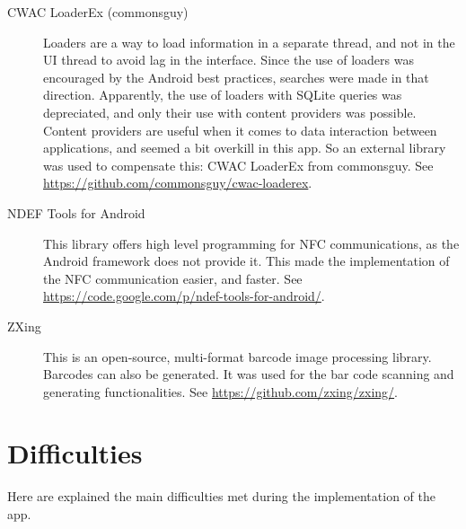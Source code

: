 \begin{description}
\item[CWAC LoaderEx (commonsguy)] Loaders are a way to load information in a separate thread, and not in the UI thread to avoid lag in the interface. Since the use of loaders was encouraged by the Android best practices, searches were made in that direction. Apparently, the use of loaders with SQLite queries was depreciated, and only their use with content providers was possible. Content providers are useful when it comes to data interaction between applications, and seemed a bit overkill in this app. So an external library was used to compensate this: CWAC LoaderEx from commonsguy. See \url{https://github.com/commonsguy/cwac-loaderex}.

\item[NDEF Tools for Android] This library offers high level programming for NFC communications, as the Android framework does not provide it. This made the implementation of the NFC communication easier, and faster. See \url{https://code.google.com/p/ndef-tools-for-android/}.

\item[ZXing] This is an open-source, multi-format barcode image processing library. Barcodes can also be generated. It was used for the bar code scanning and generating functionalities. See \url{https://github.com/zxing/zxing/}.
\end{description}



\section{Difficulties}

Here are explained the main difficulties met during the implementation of the app.

